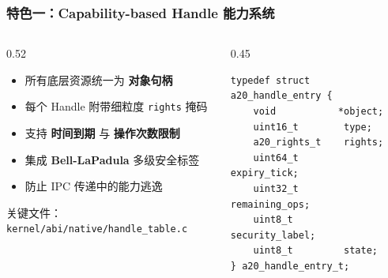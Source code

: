 \documentclass[aspectratio=1610]{beamer}
\newcommand{\code}[1]{\texttt{\footnotesize #1}}
\newcommand{\high}[1]{\textbf{\textcolor{ThemeColor}{#1}}}
\begin{document}
\begin{frame}[fragile]
    \frametitle{特色一：Capability-based Handle 能力系统}
    \begin{columns}
        \begin{column}{0.52\textwidth}
            \begin{itemize}
                \item 所有底层资源统一为 \high{对象句柄}
                \item 每个 Handle 附带细粒度 \code{rights} 掩码
                \item 支持 \high{时间到期} 与 \high{操作次数限制}
                \item 集成 \high{Bell-LaPadula} 多级安全标签
                \item 防止 IPC 传递中的能力逃逸
            \end{itemize}
            \vspace{0.3em}
            \small 关键文件：\code{kernel/abi/native/handle\_table.c}
        \end{column}
        \begin{column}{0.45\textwidth}
            \begin{lstlisting}[basicstyle=\ttfamily\tiny]
typedef struct a20_handle_entry {
    void           *object;
    uint16_t        type;
    a20_rights_t    rights;
    uint64_t        expiry_tick;
    uint32_t        remaining_ops;
    uint8_t         security_label;
    uint8_t         state;
} a20_handle_entry_t;
            \end{lstlisting}
        \end{column}
    \end{columns}
\end{frame}
\end{document}
